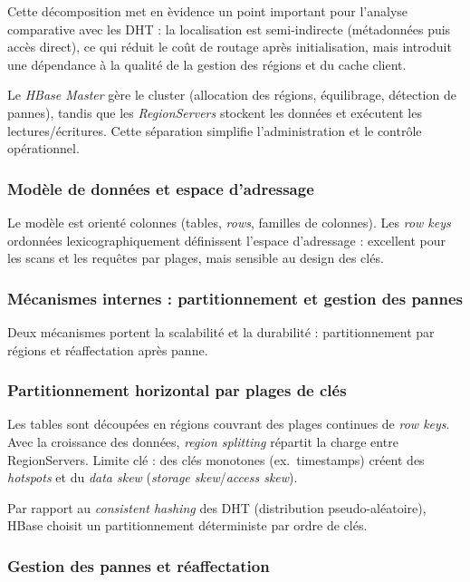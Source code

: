 Cette d\'ecomposition met en \`evidence un point important pour l'analyse comparative avec les DHT : la localisation est semi-indirecte (m\'etadonn\'ees puis acc\`es direct), ce qui r\'eduit le co\^ut de routage apr\`es initialisation, mais introduit une d\'ependance \`a la qualit\'e de la gestion des r\'egions et du cache client.

Le \emph{HBase Master} g\`ere le cluster (allocation des r\'egions, \'equilibrage, d\'etection de pannes), tandis que les \emph{RegionServers} stockent les donn\'ees et ex\'ecutent les lectures/\'ecritures. Cette s\'eparation simplifie l'administration et le contr\^ole op\'erationnel.

\subsubsection*{Mod\`ele de donn\'ees et espace d'adressage}

Le mod\`ele est orient\'e colonnes (tables, \emph{rows}, familles de colonnes). Les \emph{row keys} ordonn\'ees lexicographiquement d\'efinissent l'espace d'adressage : excellent pour les scans et les requ\^etes par plages, mais sensible au design des cl\'es.


\subsubsection{M\'ecanismes internes : partitionnement et gestion des pannes}

Deux m\'ecanismes portent la scalabilit\'e et la durabilit\'e : partitionnement par r\'egions et r\'eaffectation apr\`es panne.

\subsubsection*{Partitionnement horizontal par plages de cl\'es}

Les tables sont d\'ecoup\'ees en r\'egions couvrant des plages continues de \emph{row keys}. Avec la croissance des donn\'ees, \emph{region splitting} r\'epartit la charge entre RegionServers. Limite cl\'e : des cl\'es monotones (ex.~timestamps) cr\'eent des \emph{hotspots} et du \emph{data skew} (\emph{storage skew}/\emph{access skew}).

Par rapport au \emph{consistent hashing} des DHT (distribution pseudo-al\'eatoire), HBase choisit un partitionnement d\'eterministe par ordre de cl\'es.

\subsubsection*{Gestion des pannes et r\'eaffectation}


